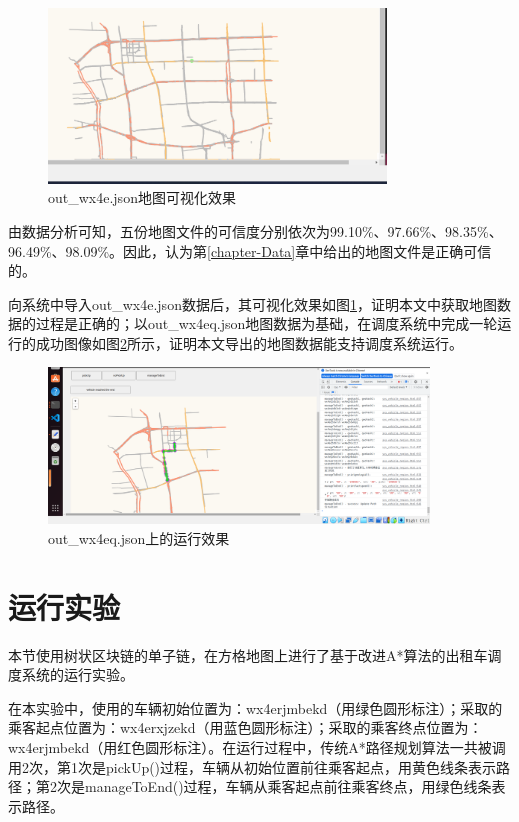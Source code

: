 \begin{figure}[ht]
  \centering
  \includegraphics[width=0.8\textwidth]{undergraduate-thesis/images/2023-05-16 (7).png}
  \caption{out\_wx4e.json地图可视化效果}
  \label{wx4esuccess} %
\end{figure}

由数据分析可知，五份地图文件的可信度分别依次为99.10\%、97.66\%、98.35\%、96.49\%、98.09\%。因此，认为第\ref{chapter-Data}章中给出的地图文件是正确可信的。

向系统中导入out\_wx4e.json数据后，其可视化效果如图\ref{wx4esuccess}，证明本文中获取地图数据的过程是正确的；以out\_wx4eq.json地图数据为基础，在调度系统中完成一轮运行的成功图像如图\ref{wx4eqsuccess}所示，证明本文导出的地图数据能支持调度系统运行。

\begin{figure}[ht]
  \centering
  \includegraphics[width=0.9\textwidth]{undergraduate-thesis/images/2023-05-16 (12).png}
  \caption{out\_wx4eq.json上的运行效果}
  \label{wx4eqsuccess} %
\end{figure}


\section{运行实验}
\label{runEx}

本节使用树状区块链的单子链，在方格地图上进行了基于改进A*算法的出租车调度系统的运行实验。

在本实验中，使用的车辆初始位置为：wx4erjmbekd（用绿色圆形标注）；采取的乘客起点位置为：wx4erxjzekd（用蓝色圆形标注）；采取的乘客终点位置为：wx4erjmbekd（用红色圆形标注）。在运行过程中，传统A*路径规划算法一共被调用2次，第1次是pickUp()过程，车辆从初始位置前往乘客起点，用黄色线条表示路径；第2次是manageToEnd()过程，车辆从乘客起点前往乘客终点，用绿色线条表示路径。

